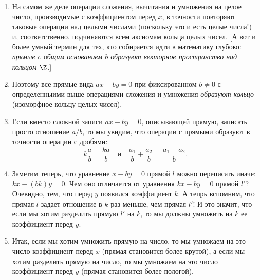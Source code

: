 \begin{enumerate}
\item На самом же деле операции сложения, вычитания и умножения на целое число, производимые с коэффициентом перед $x$, в точности повторяют таковые операции над целыми числами (поскольку это и есть целые числа!) и, соответственно, подчиняются всем аксиомам кольца целых чисел. [А вот и более умный термин для тех, кто собирается идти в математику глубоко: \textit{прямые с общим основанием $b$ образуют векторное пространство над кольцом} $\Z$.]
\item Поэтому все прямые вида $ax-by=0$ при фиксированном $b\ne 0$ с определенныими выше операциями сложения и умножения \textit{образуют кольцо} (изоморфное кольцу целых чисел). 
\item Если вместо сложной записи $ax-by=0$, описывающей прямую, записать просто отношение $a/b$, то мы увидим, что операции с прямыми образуют в точности операции с дробями:
$$
k\frac{a}{b}  = \frac{ka}{b}\quad\mbox{и}\quad\frac{a_1}{b}+\frac{a_2}{b} = \frac{a_1+a_2}{b}.
$$
\item Заметим теперь, что уравнение $x-by=0$ прямой $l$ можно переписать иначе: $kx-(bk)y=0$. Чем оно отличается от уравнения $kx-by=0$ прямой $l'$? Очевидно, тем, что перед $y$ появился коэффициент $k$. А тепрь вспомним, что прямая $l$ задает отношение в $k$ раз меньше, чем прямая $l'$! И это значит, что если мы хотим разделить прямую $l'$ на $k$, то мы должны умножить на $k$ ее коэффициент перед $y$.
\item Итак, если мы хотим умножить прямую на число, то мы умножаем на это число коэффициент перед $x$ (прямая становится более крутой), а если мы хотим разделить прямую на число, то мы умножаем на это число коэффициент перед $y$ (прямая становится более пологой).





\end{enumerate}
